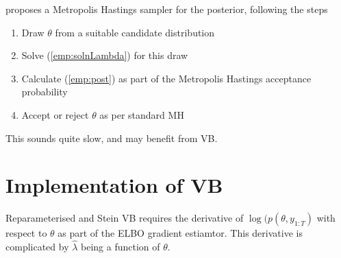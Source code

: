 \documentclass[12pt,a4paper]{article}\usepackage[]{graphicx}\usepackage[]{color}
\begin{document}
\citet{Chib2017} proposes a Metropolis Hastings sampler for the posterior, following the steps
\begin{enumerate}
\item Draw $\theta$ from a suitable candidate distribution
\item Solve (\ref{emp:solnLambda}) for this draw
\item Calculate (\ref{emp:post}) as part of the Metropolis Hastings acceptance probability
\item Accept or reject $\theta$ as per standard MH
\end{enumerate}
This sounds quite slow, and may benefit from VB.
\\

\section{Implementation of VB}

Reparameterised and Stein VB requires the derivative of $\log(p(\theta, y_{1:T})$ with respect to $\theta$ as part of the ELBO gradient estiamtor. This derivative is complicated by $\hat{\lambda}$ being a function of $\theta$.
\\
\end{document}
